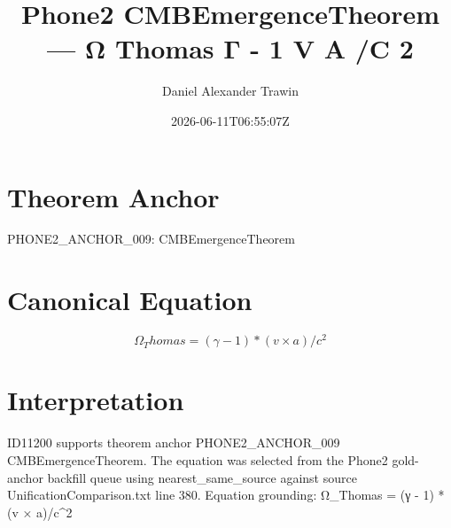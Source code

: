 \documentclass[11pt]{article}
\title{Phone2 CMBEmergenceTheorem — Ω Thomas Γ - 1 V A /C 2}
\author{Daniel Alexander Trawin}
\date{2026-06-11T06:55:07Z}
\begin{document}
\maketitle
\section*{Theorem Anchor}
PHONE2_ANCHOR_009: CMBEmergenceTheorem
\section*{Canonical Equation}
\[
Ω_Thomas = (γ - 1) * (v × a)/c^2
\]
\section*{Interpretation}
ID11200 supports theorem anchor PHONE2_ANCHOR_009 CMBEmergenceTheorem. The equation was selected from the Phone2 gold-anchor backfill queue using nearest_same_source against source UnificationComparison.txt line 380. Equation grounding: Ω_Thomas = (γ - 1) * (v × a)/c^2
\end{document}
